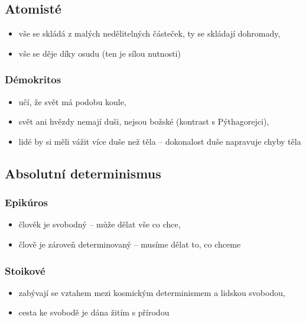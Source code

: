 \documentclass[11pt,a4paper,czech]{article}
\begin{document}
\subsection{Atomisté}

    \begin{itemize}
        \item vše se skládá z malých nedělitelných částeček, ty se skládají dohromady,
        \item vše se děje díky osudu (ten je sílou nutnosti)
    \end{itemize}

    \subsubsection{Démokritos}

    \begin{itemize}
        \item učí, že svět má podobu koule,
        \item svět ani hvězdy nemají duši, nejsou božské (kontrast s Pýthagorejci),
        \item lidé by si měli vážit více duše než těla -- dokonalost duše napravuje chyby těla
    \end{itemize}

\subsection{Absolutní determinismus}

    \subsubsection{Epikúros}
    
    \begin{itemize}
        \item člověk je svobodný -- může dělat vše co chce,
        \item člově je zároveň determinovaný -- musíme dělat to, co chceme
    \end{itemize}

    \subsubsection{Stoikové}

    \begin{itemize}
        \item zabývají se vztahem mezi kosmickým determinismem a lidskou svobodou,
        \item cesta ke svobodě je dána žitím s přírodou
    \end{itemize}
\end{document}

